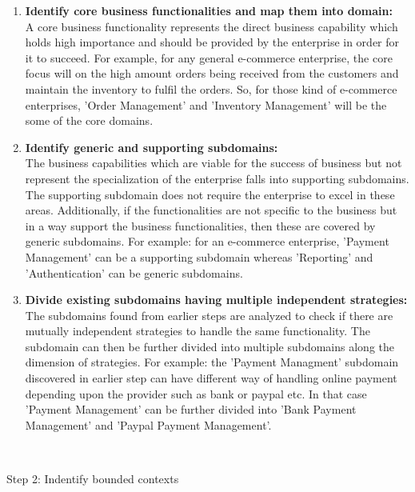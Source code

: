 \begin{enumerate}
\item \textbf{Identify core business functionalities and map them into domain:} \\
A core business functionality represents the direct business capability which holds high importance and should be provided by the enterprise in order for it to succeed. For example, for any general e-commerce enterprise, the core focus will on the high amount orders being received from the customers and maintain the inventory to fulfil the orders. So, for those kind of e-commerce enterprises, 'Order Management' and 'Inventory Management' will be the some of the core domains.
\\
\item \textbf{Identify generic and supporting subdomains:} \\
The business capabilities which are viable for the success of business but not represent the specialization of the enterprise falls into supporting subdomains. The supporting subdomain does not require the enterprise to excel in these areas. Additionally, if the functionalities are not specific to the business but in a way support the business functionalities, then these are covered by generic subdomains. For example: for an e-commerce enterprise, 'Payment Management' can be a supporting subdomain whereas 'Reporting' and 'Authentication' can be generic subdomains.\cite{Vernon:2013aa}
\\
\item \textbf{Divide existing subdomains having multiple independent strategies:}\\
The subdomains found from earlier steps are analyzed to check if there are mutually independent strategies to handle the same functionality. The subdomain can then be further divided into multiple subdomains along the dimension of strategies. For example: the 'Payment Managment' subdomain discovered in earlier step can have different way of handling online payment depending upon the provider such as bank or paypal etc. In that case 'Payment Management' can be further divided into 'Bank Payment Management' and 'Paypal Payment Management'.
\end{enumerate}
\\
\begin{shaded}Step 2: Indentify bounded contexts\end{shaded} \label{section:domain_driven_design/process_to_domain_driven_design/strategical_design/step_2}
\\
